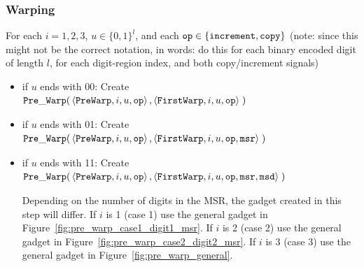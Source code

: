 \subsubsection{ Warping }

    For each $i = 1, 2, 3$, $u \in \{0, 1\}^l$, and each ${\tt op} \in \{ {\tt increment, copy } \}$
    (note: since this might not be the correct notation, in words: do this for each binary encoded digit of length $l$,
    for each digit-region index, and both copy/increment signals)


    \begin{itemize}

        \item if $u$ ends with 00:
        Create
        $\begin{aligned}[t]
            {\tt Pre\_Warp}(& \left\langle {\tt PreWarp},   i, u, {\tt op} \right\rangle,
                       \left\langle {\tt FirstWarp}, i, u, {\tt op} \right\rangle \;)
        \end{aligned}$ %

        \item if $u$ ends with 01:
        Create
        $\begin{aligned}[t]
            {\tt Pre\_Warp}(& \left\langle {\tt PreWarp},   i, u, {\tt op} \right\rangle,
                       \left\langle {\tt FirstWarp}, i, u, {\tt op}, {\tt msr} \right\rangle \;)
        \end{aligned}$ %

        \item if $u$ ends with 11:
        Create
        $\begin{aligned}[t]
            {\tt Pre\_Warp}(& \left\langle {\tt PreWarp},   i, u, {\tt op} \right\rangle,
                       \left\langle {\tt FirstWarp}, i, u, {\tt op}, {\tt msr}, {\tt msd} \right\rangle \;)
        \end{aligned}$

        Depending on the number of digits in the MSR, the gadget created in this step will differ.
        If $i$ is 1 (case 1) use the general gadget in Figure~\ref{fig:pre_warp_case1_digit1_msr}.
        If $i$ is 2 (case 2) use the general gadget in Figure~\ref{fig:pre_warp_case2_digit2_msr}.
        If $i$ is 3 (case 3) use the general gadget in Figure~\ref{fig:pre_warp_general}.



\end{itemize}
